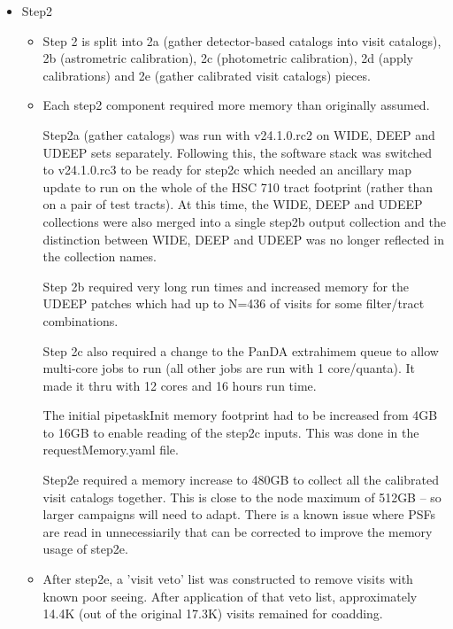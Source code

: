 \begin{itemize}
\item Step2

\begin{itemize}

 \item
	 Step 2 is split into 2a (gather detector-based catalogs into
		visit catalogs), 2b (astrometric calibration), 2c (photometric
		calibration), 2d (apply calibrations) and 2e (gather
		calibrated visit catalogs) pieces.

\item 
	Each step2 component required more memory than originally
	assumed.  

	Step2a (gather catalogs) was run with v24.1.0.rc2 on
	WIDE, DEEP and UDEEP sets separately.  Following
	this, the software stack was switched to v24.1.0.rc3 to
	be ready for step2c which needed an ancillary map update to run on
	the whole of the HSC 710 tract footprint (rather than on a
	pair of test tracts).  At this time, the WIDE, DEEP and UDEEP
	collections were also merged into a single step2b output
	collection and the distinction between WIDE, DEEP and UDEEP
	was no longer reflected in the collection names.

	
	Step 2b required very long run times and increased memory 
	for the UDEEP patches which had up to N=436 of visits for
	some filter/tract combinations.

	Step 2c also required a change to the PanDA extrahimem queue
	to allow multi-core jobs to run (all other jobs are run 
	with 1 core/quanta).  It made it thru with 12 cores and 16 hours
	run time.

	The initial pipetaskInit memory footprint had to be increased from
	4GB to 16GB to enable reading of the step2c inputs. This
	was done in the requestMemory.yaml file.

	Step2e required a memory increase to 480GB to collect all the
	calibrated visit catalogs together. This is close to the 
	node maximum of 512GB -- so larger campaigns will need to adapt.
	There is a known issue where PSFs are read in unnecessiarily that
	can be corrected to improve the memory usage of step2e.

\item 
	After step2e, a 'visit veto' list was constructed to remove
	visits with known poor seeing.  After application of that 
	veto list, approximately 14.4K (out of the original 17.3K) visits
	remained for coadding.

\end{itemize} %


\end{itemize}
